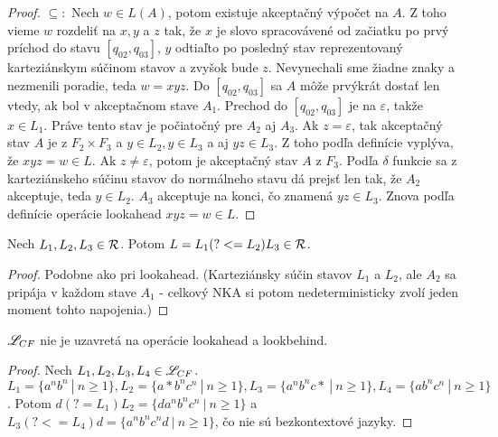 \begin{proof}
$ \subseteq: $ Nech $w \in L(A)$, potom existuje akceptačný výpočet na $A$. Z toho vieme $w$ rozdeliť na $x,y$ a $z$ tak, že $x$ je slovo spracovávené od začiatku po prvý príchod do stavu $\left[q_{02},q_{03}\right]$, $y$ odtiaľto po posledný stav reprezentovaný karteziánskym súčinom stavov a zvyšok bude $z$. Nevynechali sme žiadne znaky a nezmenili poradie, teda $w=xyz$. Do $\left[q_{02},q_{03}\right]$ sa $A$ môže prvýkrát dostať len vtedy, ak bol v akceptačnom stave $A_1$. Prechod do $\left[q_{02},q_{03}\right]$ je na $\varepsilon$, takže $x \in L_1$. Práve tento stav je počiatočný pre $A_2$ aj $A_3$. Ak $z=\varepsilon$, tak akceptačný stav $A$ je z $F_2\times F_3$ a $y \in L_2, y \in L_3$ a aj $yz \in L_3$. Z toho podľa definície vyplýva, že $xyz=w \in L$. Ak $z\neq \varepsilon$, potom je akceptačný stav $A$ z $F_3$. Podľa $\delta$ funkcie sa z karteziánskeho súčinu stavov do normálneho stavu dá prejsť len tak, že $A_2$ akceptuje, teda $y \in L_2$. $A_3$ akceptuje na konci, čo znamená $yz \in L_3$. Znova podľa definície operácie lookahead $xyz=w \in L$.
\end{proof}

\begin{veta}
Nech $ L_{1}, L_{2}, L_{3} \in {\cal R} $. Potom $ L = L_{1}(?<=L_{2})L_{3} \in {\cal R} $.
\end{veta}
\begin{proof}
Podobne ako pri lookahead. (Karteziánsky súčin stavov $L_1$ a $L_2$, ale $A_2$ sa pripája v každom stave $A_1$ - celkový NKA si potom nedeterministicky zvolí jeden moment tohto napojenia.)
\end{proof}

\begin{veta}
$ \mathscr{L}_{CF} $ nie je uzavretá na operácie lookahead a lookbehind.
\end{veta}
\begin{proof}
Nech $ L_{1}, L_{2}, L_{3}, L_4 \in \mathscr{L}_{CF} $. $ L_1 = \lbrace a^nb^n ~|~ n\geq 1 \rbrace , L_2 = \lbrace a*b^nc^n ~|~ n\geq 1\rbrace , L_3 = \lbrace a^nb^nc* ~|~ n \geq 1\rbrace, L_4 = \lbrace ab^nc^n ~|~ n \geq 1 \rbrace$. Potom $ d(?=L_1)L_2 = \lbrace da^nb^nc^n ~|~ n\geq 1 \rbrace $ a $ L_3(?<=L_4)d = \lbrace a^nb^nc^nd ~|~ n\geq 1 \rbrace$, čo nie sú bezkontextové jazyky.
\end{proof}

